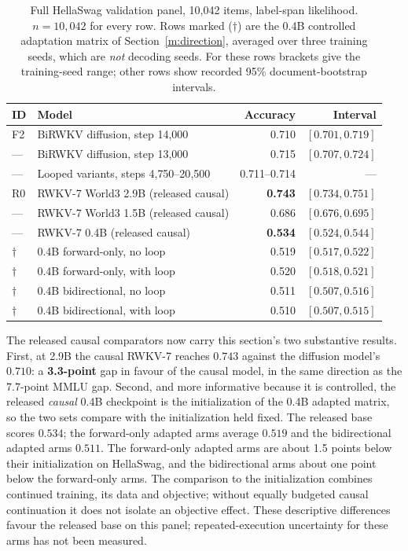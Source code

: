 \begin{table}[t]
\centering\small
\caption{Full HellaSwag validation panel, 10{,}042 items, label-span likelihood.
$n=10{,}042$ for every row. Rows marked ($\dagger$) are the 0.4B controlled adaptation
matrix of Section~\ref{m:direction}, averaged over three training seeds, which are
\emph{not} decoding seeds. For these rows brackets give the training-seed range; other rows show recorded 95\% document-bootstrap intervals.}
\begin{tabular}{@{}llrr@{}}
\toprule
ID & Model & Accuracy & Interval\\
\midrule
F2 & BiRWKV diffusion, step 14{,}000 & 0.710 & $[0.701,0.719]$\\
--- & BiRWKV diffusion, step 13{,}000 & 0.715 & $[0.707,0.724]$\\
--- & Looped variants, steps 4{,}750--20{,}500 & 0.711--0.714 & ---\\
\midrule
R0 & RWKV-7 World3 2.9B (released causal) & \textbf{0.743} & $[0.734,0.751]$\\
--- & RWKV-7 World3 1.5B (released causal) & 0.686 & $[0.676,0.695]$\\
--- & RWKV-7 0.4B (released causal) & \textbf{0.534} & $[0.524,0.544]$\\
\midrule
$\dagger$ & 0.4B forward-only, no loop & 0.519 & $[0.517,0.522]$\\
$\dagger$ & 0.4B forward-only, with loop & 0.520 & $[0.518,0.521]$\\
$\dagger$ & 0.4B bidirectional, no loop & 0.511 & $[0.507,0.516]$\\
$\dagger$ & 0.4B bidirectional, with loop & 0.510 & $[0.507,0.515]$\\
\bottomrule
\end{tabular}
\label{tab:hellaswag}
\end{table}

The released causal comparators now carry this section's two substantive results. First,
at 2.9B the causal RWKV-7 reaches $0.743$ against the diffusion model's $0.710$: a
\textbf{3.3-point} gap in favour of the causal model, in the same direction as the 7.7-point MMLU gap. Second, and
more informative because it is controlled, the released \emph{causal} 0.4B checkpoint is
the initialization of the 0.4B adapted matrix, so the two sets compare with the
initialization held fixed. The released base scores $0.534$; the forward-only adapted arms
average $0.519$ and the bidirectional adapted arms $0.511$. The forward-only adapted arms are about 1.5 points below their initialization on HellaSwag, and the bidirectional arms about one point below the forward-only arms. The comparison to the initialization combines continued training, its data and objective; without equally budgeted causal continuation it does not isolate an objective effect.
These descriptive differences favour the released base on this panel; repeated-execution uncertainty for these arms has not been measured.

